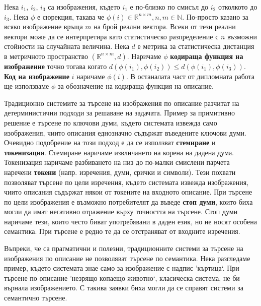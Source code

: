 \documentclass[a4paper,12pt]{article}
\begin{document}
\bigbreak

Нека $i_1$, $i_2$, $i_3$ са изображения, където $i_1$ е по-близко по смисъл до $i_2$ отколкото до $i_3$. Нека $\phi$ е сюрекция, такава че $\phi(i) \in \mathbb{R}^{n \times m}, n,m \in \mathbb{N}$. По-просто казано за всяко изображение връща $m$ на брой реални вектора. Всеки от тези реални вектори може да се интерпретира като статистическо разпределение с $n$ възможни стойности на случайната величина. Нека $d$ е метрика за статистическа дистанция в метричното пространство $(\mathbb{R}^{n \times m}, d)$. Наричаме $\phi$ \textbf{кодираща функция на изображение} точно тогава когато $d(\phi(i_1), \phi(i_2)) \leq d(\phi(i_1), \phi(i_3))$. \textbf{Код на изображение} $i$ наричаме $\phi(i). $ В останалата част от дипломната работа ще използваме $\phi$ за обозначение на кодираща функция на описание.

\bigbreak

Традиционно системите за търсене на изображения по описание разчитат на детерминистични подходи за решаване на задачата. Пример за примитивно решение е търсене по ключови думи, където системата извежда само изображения, чиито описания еднозначно съдържат въведените ключови думи. Очевидно подобрение на този подход е да се използват \textbf{стемиране} и \textbf{токенизация}. Стемиране наричаме извличането на корена на дадена дума. Токенизация наричаме разбиването на низ до по-малки смислени парчета наречени \textbf{токени} (напр. изречения, думи, срички и символи). Тези похвати позволяват търсене по цели изречения, където системата извежда изображения, чиито описания съдържат някои от токените на входното описание. При търсене по цели изображения е възможно потребителят да въведе \textbf{стоп думи}, които биха могли да имат негативно отражение върху точността на търсене. Стоп думи наричаме тези, които често биват употребявани в даден език, но не носят особена семантика. При търсене е редно те да се отстраняват от входните изречения.

\bigbreak

Въпреки, че са прагматични и полезни, традиционните системи за търсене на изображения по описание не позволяват търсене по семантика. Нека разгледаме пример, където системата знае само за изображение с надпис 'къртица`. При търсене по описание 'незрящо копаещо животно`, класическа система, не би върнала изображението. С такива заявки биха могли да се справят системи за семантично търсене.

\bigbreak
\end{document}
